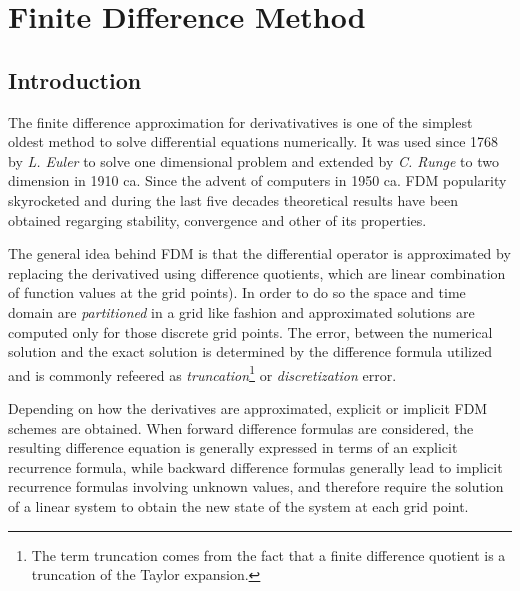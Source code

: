 
\chapter{Finite Difference Method}

\section{Introduction}
The finite difference approximation for derivativatives is one of the simplest oldest method to solve differential equations numerically. It was used since 1768 by \textit{L. Euler} to solve one dimensional problem and extended by \textit{C. Runge} to two dimension in 1910 ca. Since the advent of computers in 1950 ca. FDM  popularity skyrocketed and during the last five decades theoretical results have been obtained regarging stability, convergence and other of its properties.



    The general idea behind FDM is that the differential operator is approximated by replacing the derivatived using difference quotients, which are linear combination of function values at the grid points). In order to do so the space and time domain are \textit{partitioned} in a grid like fashion and approximated solutions are computed only for those discrete grid points.
    The error, between the numerical solution and the exact solution is determined by the difference formula utilized and is commonly refeered as \textit{truncation}\footnote{The term truncation comes from the fact that a finite difference quotient is a truncation of the Taylor expansion.} or \textit{discretization} error.
    
        
    Depending on how the derivatives are approximated, explicit or implicit FDM schemes are
    obtained. When forward difference formulas are considered, the
    resulting difference equation is generally expressed in terms of
    an explicit recurrence formula, while backward difference formulas
    generally lead to implicit recurrence formulas involving unknown
    values, and therefore require the solution of a linear system to
    obtain the new state of the system at each grid point.
    
